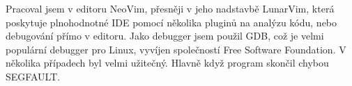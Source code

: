 Pracoval jsem v editoru NeoVim, přesněji v jeho nadstavbě LunarVim, která
poskytuje plnohodnotné IDE pomocí několika pluginů na analýzu kódu, nebo
debugování přímo v editoru. Jako debugger jsem použil GDB, což je velmi
populární debugger pro Linux, vyvíjen společností Free Software Foundation.
V několika případech byl velmi užitečný. Hlavně když program skončil
chybou SEGFAULT.
